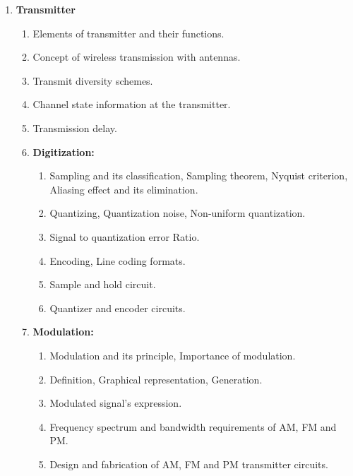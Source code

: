 \documentclass[a4paper,12pt]{article}
\begin{document}
\begin{enumerate}[leftmargin=*, align=left]
		\item \textbf{Transmitter}
		\begin{enumerate}[label*=\arabic*.]
			\item Elements of transmitter and their functions.
			\item Concept of wireless transmission with antennas.
			\item Transmit diversity schemes.
			\item Channel state information at the transmitter.
			\item Transmission delay.
			\item \textbf{Digitization:}
			\begin{enumerate}[label*=\arabic*.]
				\item Sampling and its classification, Sampling theorem, Nyquist criterion, Aliasing effect and its elimination.
				\item Quantizing, Quantization noise, Non-uniform quantization.
				\item Signal to quantization error Ratio.
				\item Encoding, Line coding formats.
				\item Sample and hold circuit.
				\item Quantizer and encoder circuits.
			\end{enumerate}
			\item \textbf{Modulation:}
			\begin{enumerate}[label*=\arabic*.]
				\item Modulation and its principle, Importance of modulation.
				\item Definition, Graphical representation, Generation.
				\item Modulated signal’s expression.
				\item Frequency spectrum and bandwidth requirements of AM, FM and PM.
				\item Design and fabrication of AM, FM and PM transmitter circuits.
			\end{enumerate}
		\end{enumerate}
		

\end{enumerate}
\end{document}
